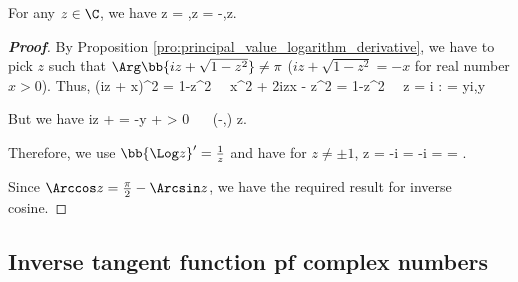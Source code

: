\begin{proposition}
For any $z\in \C$, we have %
\beast
{}\Arcsin z =  ,\qquad {}\Arccos z =  -,\qquad z\neq {}.
\eeast
\end{proposition}

\begin{proof}[\bf Proof]
By Proposition \ref{pro:principal_value_logarithm_derivative}, we have to pick $z$ such that $\Arg\bb{iz + \sqrt{1-z^2}} \neq \pi$ ($iz + \sqrt{1-z^2} = -x$ for real number $x>0$). Thus,
\be
(iz + x)^2 = 1-z^2 \ \ra\ x^2 + 2izx - z^2 = 1-z^2 \ \ra\ z = i : = yi,\quad y\in \R
\ee

But we have
\be
iz +  = -y +  > 0 \ \ra\ \Arg{} \in (-\pi,\pi) \quad {}z\in \C.
\ee

%

Therefore, we use $\bb{\Log z}' = \frac 1z$ and have for $z\neq \pm 1$,
\be
{}\Arcsin z = -i  \Log{} = -i   =  = .
\ee



Since $\Arccos z = \frac{\pi}2 - \Arcsin z$, we have the required result for inverse cosine.
\end{proof}

\subsection{Inverse tangent function pf complex numbers}

